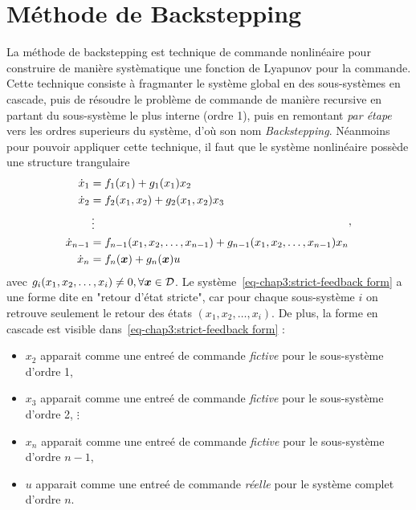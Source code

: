\section{Méthode de Backstepping}
La méthode de backstepping est technique de commande nonlinéaire pour construire de manière systèmatique une fonction de Lyapunov pour la commande. Cette technique consiste à fragmanter le système  global en des sous-systèmes en cascade, puis de résoudre le problème de commande de manière recursive en partant du sous-système le plus interne (ordre 1), puis en remontant \emph{par étape} vers les ordres superieurs du système, d'où son nom \emph{Backstepping}. Néanmoins pour pouvoir appliquer cette technique, il faut que  le système nonlinéaire possède une structure trangulaire
\begin{align}\label{eq-chap3:strict-feedback form}
	\begin{split}
		\dot{x}_1 &= f_1(x_1) + g_1(x_1)x_2\\
		\dot{x}_2 &= f_2(x_1,x_2) + g_2(x_1,x_2)x_3\\
		&\vdots \\
		\dot{x}_{n-1} &= f_{n-1}(x_1,x_2,\ldots,x_{n-1}) +  g_{n-1}(x_1,x_2,\ldots,x_{n-1})x_n\\
		\dot{x}_n &= f_{n}(\bm{x}) +  g_{n}(\bm{x})u
	\end{split},
\end{align} 
avec $g_i(x_1,x_2,\ldots,x_i)\neq0, \forall \bm{x}\in{\cal D}$. Le système~\eqref{eq-chap3:strict-feedback form} a une forme dite en "retour d'état stricte", car pour chaque sous-système $i$ on retrouve seulement le retour des états $(x_1,x_2,\ldots,x_i)$. De plus,  la forme en cascade est visible dans~\eqref{eq-chap3:strict-feedback form} : 
\begin{itemize}
	\item $x_2$ apparait comme une entreé de commande \emph{fictive} pour le sous-système d'ordre 1,
	\item $x_3$ apparait comme une entreé de commande \emph{fictive} pour le sous-système d'ordre 2, $\vdots$
	\item  $x_n$ apparait comme une entreé de commande \emph{fictive} pour le sous-système d'ordre $n-1$, 
	\item  $u$ apparait comme une entreé de commande \emph{réelle} pour le système complet d'ordre  $n$.
\end{itemize}

